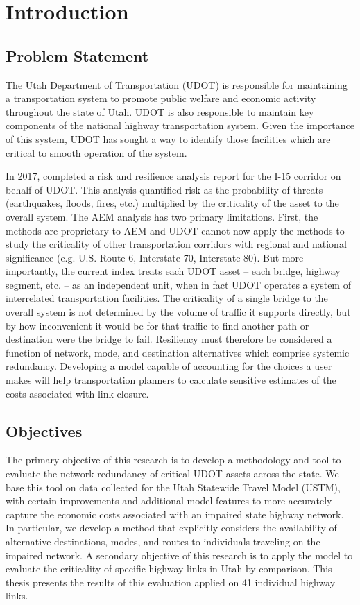 \chapter{Introduction}
\label{chp:chapter1}
\graphicspath{{figures/}{figures/chapter1/}}

\section{Problem Statement}
The Utah Department of Transportation (UDOT) is responsible for maintaining a
transportation system to promote public welfare and economic activity throughout
the state of Utah. UDOT is also responsible to maintain key components of the
national highway transportation system. Given the importance of this system,
UDOT has sought a way to identify those facilities which are critical to smooth
operation of the system.

In 2017, \citet{aem2017} completed a risk and resilience analysis report for the I-15 corridor on behalf of
UDOT. This analysis quantified risk as the probability of threats (earthquakes, floods, fires,
etc.) multiplied by the criticality of the asset to the overall system. The AEM
analysis has two primary limitations. First, the methods are proprietary to
AEM and UDOT cannot now apply the methods to study the criticality of other transportation
corridors with regional and national significance (e.g. U.S. Route 6, Interstate 70, Interstate 80). But more
importantly, the current index treats each UDOT asset – each bridge, highway segment, etc. – as an
independent unit, when in fact UDOT operates a system of interrelated transportation facilities. The criticality
of a single bridge to the overall system is not determined by the volume of traffic it supports
directly, but by how inconvenient it would be for that traffic to find another path or destination
were the bridge to fail. Resiliency must therefore be considered a function of network, mode, and destination
alternatives which comprise systemic redundancy. Developing a model capable of accounting for the choices a user makes will help
transportation planners to calculate sensitive estimates of the costs associated with link closure.

\section{Objectives}
The primary objective of this research is to develop a methodology and tool to evaluate the
network redundancy of critical UDOT assets across the state. We base this tool on data collected
for the Utah Statewide Travel Model (USTM), with certain improvements and additional model
features to more accurately capture the economic costs associated with an impaired state highway
network. In particular, we develop a method that explicitly considers the availability of
alternative destinations, modes, and routes to individuals traveling on the impaired network. A
secondary objective of this research is to apply the model to evaluate the criticality of
specific
highway links in Utah by comparison. This thesis presents the results of this evaluation applied
on 41 individual highway links.

